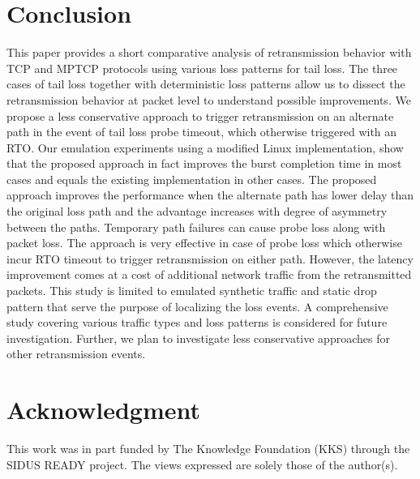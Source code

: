 \documentclass[10pt,conference]{IEEEtran}
\begin{document}
\section{Conclusion}\label{conc}
This paper provides a short comparative analysis of retransmission behavior with TCP and MPTCP protocols using various loss patterns for tail loss.
The three cases of tail loss together with deterministic loss patterns allow us to dissect the retransmission behavior at packet level to understand possible improvements.
We propose a less conservative approach to trigger retransmission on an alternate path in the event of tail loss probe timeout, which otherwise triggered with an RTO. 
Our emulation experiments  using a modified Linux implementation, show that the proposed approach in fact improves the burst completion time in most cases and equals the existing
implementation in other cases. The proposed approach improves the performance when the alternate path has lower delay than the original loss path and the advantage increases with degree of asymmetry between the paths. Temporary path failures can cause probe loss along with packet loss. The approach is very effective in case of probe loss which otherwise incur RTO timeout to trigger retransmission on either path. However, the latency improvement comes at a cost of additional network traffic from the retransmitted packets. This study is limited to emulated synthetic traffic and static drop pattern that serve the purpose of localizing the loss events. A comprehensive study covering various traffic types and loss patterns is considered for future investigation. Further, we plan to investigate less conservative approaches for other retransmission events.

\section*{Acknowledgment}
This work was in part funded by The Knowledge Foundation (KKS) through the SIDUS READY project.
The views expressed are solely those of the author(s).
   


\end{document}

